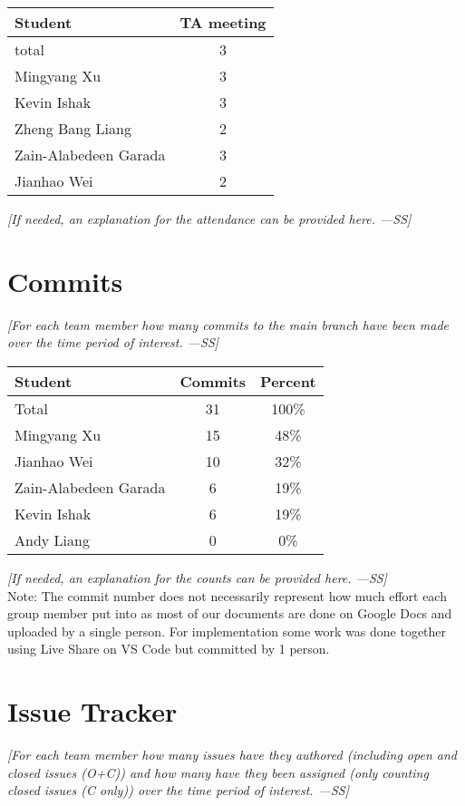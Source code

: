 \documentclass[12pt]{article}
\begin{document}
\begin{longtable}{|l|c|}
\hline
\textbf{Student} & \textbf{TA meeting} \\
\hline
total & 3 \\
Mingyang Xu & 3 \\
Kevin Ishak & 3 \\
Zheng Bang Liang & 2 \\
Zain-Alabedeen Garada & 3 \\
Jianhao Wei & 2 \\
\hline
\end{longtable}

\textit{[If needed, an explanation for the attendance can be provided here. ---SS]}

\section{Commits}
\textit{[For each team member how many commits to the main branch have been made over the time period of interest. ---SS]}

\begin{longtable}{|l|c|c|}
\hline
\textbf{Student} & \textbf{Commits} & \textbf{Percent} \\
\hline
Total & 31 & 100\% \\
Mingyang Xu & 15 & 48\% \\
Jianhao Wei & 10 & 32\% \\
Zain-Alabedeen Garada & 6 & 19\% \\
Kevin Ishak & 6 & 19\% \\
Andy Liang & 0 & 0\% \\
\hline
\end{longtable}

\textit{[If needed, an explanation for the counts can be provided here. ---SS]}
\\Note: The commit number does not necessarily represent how much effort each group member put into as most of our documents are done on Google Docs and uploaded by a single person.
For implementation some work was done together using Live Share on VS Code but committed by 1 person.

\section{Issue Tracker}
\textit{[For each team member how many issues have they authored (including open and closed issues (O+C)) and how many have they been assigned (only counting closed issues (C only)) over the time period of interest. ---SS]}
\end{document}
